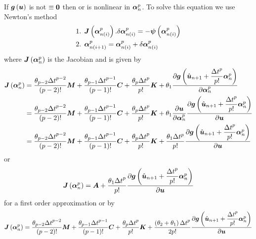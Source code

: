 If $  \boldsymbol{g} \left(  \boldsymbol{u}  \right) $ is not $\equiv \boldsymbol{0} $ then
 or  is nonlinear in $ \boldsymbol{\alpha} ^{p}_{n}$. To solve this
equation we use Newton's method \ie
\begin{equation}
  \begin{split}
    \text{1.  } & \fnof{\matr{J}}{\vectr{\alpha}^{p}_{n(i)}}.\delta
    \vectr{\alpha}^{p}_{n(i)} = 
    -\fnof{\vectr{\psi}}{\vectr{\alpha}^{p}_{n(i)}} \\
    \text{2.  } & \vectr{\alpha}^{p}_{n(i+1)}=\vectr{\alpha}^{p}_{n(i)}+\delta
    \vectr{\alpha}^{p}_{n(i)}
  \end{split}
\end{equation}
where $\fnof{\matr{J}}{\vectr{\alpha}^{p}_{n}}$ is the Jacobian and is given by
  \begin{align}
    \fnof{\matr{J}}{\vectr{\alpha}^{p}_{n}}&=\dfrac{\theta_{p-2}{\Delta t}^{p-2}}{\factorial{p-2}}\matr{M}+
    \dfrac{\theta_{p-1}{\Delta
      t}^{p-1}}{\factorial{p-1}}\matr{C}+\dfrac{\theta_{p}{\Delta t}^{p}}{p!}\matr{K}+
  \theta_{1}
  \delby{\fnof{\vectr{g}}{\hat{\vectr{u}}_{n+1}+\dfrac{{\Delta
          t}^{p}}{p!}
      \vectr{\alpha}^{p}_{n}}}{\vectr{\alpha}^{p}_{n}}\\
      &=\dfrac{\theta_{p-2}{\Delta t}^{p-2}}{\factorial{p-2}}\matr{M}+
    \dfrac{\theta_{p-1}{\Delta
      t}^{p-1}}{\factorial{p-1}}\matr{C}+\dfrac{\theta_{p}{\Delta t}^{p}}{p!}\matr{K}+
  \theta_{1}\delby{\vectr{u}}{\vectr{\alpha}^{p}_{n}}
  \delby{\fnof{\vectr{g}}{\hat{\vectr{u}}_{n+1}+\dfrac{{\Delta
          t}^{p}}{p!}
      \vectr{\alpha}^{p}_{n}}}{\vectr{u}}\\
      &=\dfrac{\theta_{p-2}{\Delta t}^{p-2}}{\factorial{p-2}}\matr{M}+
    \dfrac{\theta_{p-1}{\Delta
      t}^{p-1}}{\factorial{p-1}}\matr{C}+\dfrac{\theta_{p}{\Delta t}^{p}}{p!}\matr{K}+
  \dfrac{\theta_{1}\Delta t^{p}}{p!}
  \delby{\fnof{\vectr{g}}{\hat{\vectr{u}}_{n+1}+\dfrac{{\Delta
          t}^{p}}{p!}
      \vectr{\alpha}^{p}_{n}}}{\vectr{u}}
  \end{align}
or
\begin{equation}
  \fnof{\matr{J}}{\vectr{\alpha}^{p}_{n}}=\matr{A}+\dfrac{\theta_{1}{\Delta
      t}^{p}}{p!}
  \delby{\fnof{\vectr{g}}{\hat{\vectr{u}}_{n+1}+\dfrac{{\Delta t}^{p}}{p!}\vectr{\alpha}^{p}_{n}}}{\vectr{u}}
\end{equation}
for a first order approximation or by
\begin{equation}
  \fnof{\matr{J}}{\vectr{\alpha}^{p}_{n}}=\dfrac{\theta_{p-2}{\Delta t}^{p-2}}{\factorial{p-2}}\matr{M}+
  \dfrac{\theta_{p-1}{\Delta
      t}^{p-1}}{\factorial{p-1}}\matr{C}+\dfrac{\theta_{p}{\Delta t}^{p}}{p!}\matr{K}+
  \dfrac{\pbrac{\theta_{2}+\theta_{1}}{\Delta t}^{p}}{2p!}
  \delby{\fnof{\vectr{g}}{\hat{\vectr{u}}_{n+1}+\dfrac{{\Delta
          t}^{p}}{p!}
      \vectr{\alpha}^{p}_{n}}}{\vectr{u}}
\end{equation}
